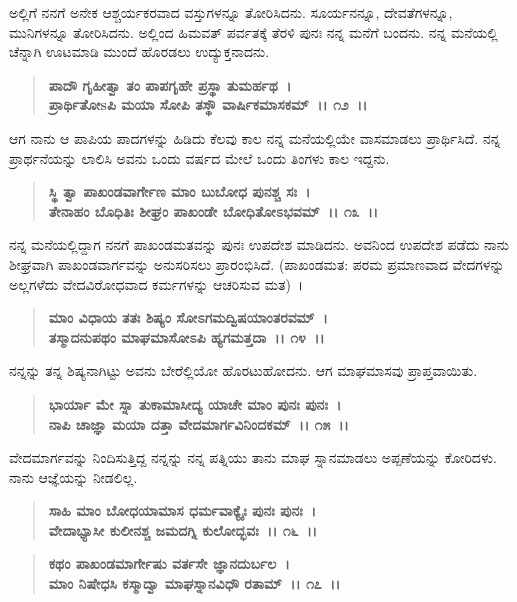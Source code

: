 ಅಲ್ಲಿಗೆ ನನಗೆ ಅನೇಕ ಆಶ್ಚರ್ಯಕರವಾದ ವಸ್ತುಗಳನ್ನೂ ತೋರಿಸಿದನು. ಸೂರ್ಯನನ್ನೂ, ದೇವತೆಗಳನ್ನೂ, ಮುನಿಗಳನ್ನೂ ತೋರಿಸಿದನು. ಅಲ್ಲಿಂದ ಹಿಮವತ್ ಪರ್ವತಕ್ಕೆ ತೆರಳಿ ಪುನಃ ನನ್ನ ಮನೆಗೆ ಬಂದನು. ನನ್ನ ಮನೆಯಲ್ಲಿ ಚೆನ್ನಾಗಿ ಊಟಮಾಡಿ ಮುಂದೆ ಹೊರಡಲು ಉದ್ಯುಕ್ತನಾದನು.

\begin{verse}
\textbf{ಪಾದೌ ಗೃಹೀತ್ವಾ ತಂ ಪಾಪಗೃಹೇ ಪ್ರಸ್ಥಾ ತುಮರ್ಹಥ~।}\\\textbf{ಪ್ರಾರ್ಥಿತೋsಪಿ ಮಯಾ ಸೋಪಿ ತಸ್ಥೌ ವಾರ್ಷಿಕಮಾಸಕಮ್~।। ೧೨~।।}
\end{verse}

ಆಗ ನಾನು ಆ ಪಾಪಿಯ ಪಾದಗಳನ್ನು ಹಿಡಿದು ಕೆಲವು ಕಾಲ ನನ್ನ ಮನೆಯಲ್ಲಿಯೇ ವಾಸಮಾಡಲು ಪ್ರಾರ್ಥಿಸಿದೆ. ನನ್ನ ಪ್ರಾರ್ಥನೆಯನ್ನು ಲಾಲಿಸಿ ಅವನು ಒಂದು ವರ್ಷದ ಮೇಲೆ ಒಂದು ತಿಂಗಳು ಕಾಲ ಇದ್ದನು.

\begin{verse}
\textbf{ಸ್ಥಿ ತ್ವಾ ಪಾಖಂಡವಾರ್ಗೇಣ ಮಾಂ ಬುಬೋಧ ಪುನಶ್ಚ ಸಃ~।}\\\textbf{ತೇನಾಹಂ ಬೊಧಿತಿಃ ಶೀಘ್ರಂ ಪಾಖಂಡೇ ಬೋಧಿತೋಽಭವಮ್~।। ೧೩~।।}
\end{verse}

ನನ್ನ ಮನೆಯಲ್ಲಿದ್ದಾಗ ನನಗೆ ಪಾಖಂಡಮತವನ್ನು ಪುನಃ ಉಪದೇಶ ಮಾಡಿದನು. ಅವನಿಂದ ಉಪದೇಶ ಪಡೆದು ನಾನು ಶೀಘ್ರವಾಗಿ ಪಾಖಂಡವಾರ್ಗವನ್ನು ಅನುಸರಿಸಲು ಪ್ರಾರಂಭಿಸಿದೆ. (ಪಾಖಂಡಮತ: ಪರಮ ಪ್ರಮಾಣವಾದ ವೇದಗಳನ್ನು ಅಲ್ಲಗಳೆದು ವೇದವಿರೋಧವಾದ ಕರ್ಮಗಳನ್ನು ಆಚರಿಸುವ ಮತ)~।

\begin{verse}
\textbf{ಮಾಂ ವಿಧಾಯ ತತಃ ಶಿಷ್ಯಂ ಸೋಽಗಮದ್ವಿಷಯಾಂತರವಮ್~।}\\\textbf{ತಸ್ಮಾದನುಪಥಂ ಮಾಘಮಾಸೋಽಪಿ ಹ್ಯಗಮತ್ತದಾ~।। ೧೪~।।}
\end{verse}

ನನ್ನನ್ನು ತನ್ನ ಶಿಷ್ಯನಾಗಿಟ್ಟು ಅವನು ಬೇರೆಲ್ಲಿಯೋ ಹೊರಟುಹೋದನು. ಆಗ ಮಾಘಮಾಸವು ಪ್ರಾಪ್ತವಾಯಿತು.

\begin{verse}
\textbf{ಭಾರ್ಯಾ ಮೇ ಸ್ನಾ ತುಕಾಮಾಸೀದ್ಯ ಯಾಚೇ ಮಾಂ ಪುನಃ ಪುನಃ~।}\\\textbf{ನಾಪಿ ಚಾಜ್ಞಾ ಮಯಾ ದತ್ತಾ ವೇದಮಾರ್ಗವಿನಿಂದಕಮ್~।। ೧೫~।।}
\end{verse}

ವೇದಮಾರ್ಗವನ್ನು ನಿಂದಿಸುತ್ತಿದ್ದ ನನ್ನನ್ನು ನನ್ನ ಪತ್ನಿಯು ತಾನು ಮಾಘ ಸ್ನಾನಮಾಡಲು ಅಪ್ಪಣೆಯನ್ನು ಕೋರಿದಳು. ನಾನು ಆಜ್ಞೆಯನ್ನು ನೀಡಲಿಲ್ಲ.

\begin{verse}
\textbf{ಸಾಹಿ ಮಾಂ ಬೋಧಯಾಮಾಸ ಧರ್ಮವಾಕ್ಯೈಃ ಪುನಃ ಪುನಃ~।}\\\textbf{ವೇದಾಭ್ಯಾಸೀ ಕುಲೀನಶ್ಚ ಜಮದಗ್ನಿ ಕುಲೋದ್ಭವಃ~।। ೧೬~।।} 
\end{verse}

\begin{verse}
\textbf{ಕಥಂ ಪಾಖಂಡಮಾರ್ಗೇಷು ವರ್ತಸೇ ಜ್ಞಾನದುರ್ಬಲ~।}\\\textbf{ಮಾಂ ನಿಷೇಧಸಿ ಕಸ್ಮಾದ್ವಾ ಮಾಘಸ್ನಾನವಿಧೌ ರತಾಮ್~।। ೧೭~।।}
\end{verse}

